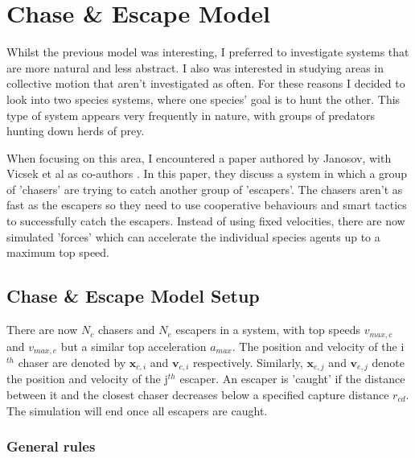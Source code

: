 \documentclass[%
11pt,
amsmath, amssymb,
aps,
pra
]{revtex4-2}
\begin{document}
\section{Chase \& Escape Model}
Whilst the previous model was interesting, I preferred to investigate systems that are more natural and less abstract. 
I also was interested in studying areas in collective motion that aren't investigated as often. For these reasons I
decided to look into two species systems, where one species' goal is to hunt the other. This type of system appears very
frequently in nature, with groups of predators hunting down herds of prey. 

When focusing on this area, I encountered a paper authored by Janosov, with Vicsek et al as co-authors \cite{janosov2017group}.
In this paper, they discuss a system in which a group of 'chasers' are trying to catch another group of 'escapers'. 
The chasers aren't as fast as the escapers so they need to use cooperative behaviours and smart tactics to successfully
catch the escapers. Instead of using fixed velocities, there are now simulated 'forces' which can accelerate the individual
species agents up to a maximum top speed.

\subsection{Chase \& Escape Model Setup}
There are now \(N_c\) chasers and \(N_e\) escapers in a system, with top speeds \(v_{max, c}\) and \(v_{max, e}\) but 
a similar top acceleration \(a_{max}\). 
The position and velocity of the i\(^{th}\) chaser are denoted by \(\mathbf{x}_{c,i}\) and \(\mathbf{v}_{c,i}\) respectively.
Similarly, \(\mathbf{x}_{e,j}\) and \(\mathbf{v}_{e,j}\) denote the position and velocity of the j\(^{th}\) escaper.
An escaper is 'caught' if the distance between it and the closest chaser decreases below a specified capture distance \(r_{cd}\).
The simulation will end once all escapers are caught.
\subsubsection{General rules}
\end{document}
